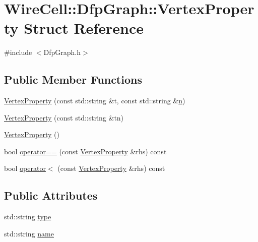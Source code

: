 \hypertarget{struct_wire_cell_1_1_dfp_graph_1_1_vertex_property}{}\section{Wire\+Cell\+:\+:Dfp\+Graph\+:\+:Vertex\+Property Struct Reference}
\label{struct_wire_cell_1_1_dfp_graph_1_1_vertex_property}


{\ttfamily \#include $<$Dfp\+Graph.\+h$>$}

\subsection*{Public Member Functions}
\begin{DoxyCompactItemize}
\item 
\hyperlink{struct_wire_cell_1_1_dfp_graph_1_1_vertex_property_afef179915e2a8a66724551085f56f5ac}{Vertex\+Property} (const std\+::string \&t, const std\+::string \&\hyperlink{format_8h_a9ab7e5832cef391eb8b1505a601fb215}{n})
\item 
\hyperlink{struct_wire_cell_1_1_dfp_graph_1_1_vertex_property_a5d8948abaad7fdf95ec657554fe7afdc}{Vertex\+Property} (const std\+::string \&tn)
\item 
\hyperlink{struct_wire_cell_1_1_dfp_graph_1_1_vertex_property_aebaece3fefd544d157a47677747ae10b}{Vertex\+Property} ()
\item 
bool \hyperlink{struct_wire_cell_1_1_dfp_graph_1_1_vertex_property_a21acb1b8b4e4c8444928de9b3c140289}{operator==} (const \hyperlink{struct_wire_cell_1_1_dfp_graph_1_1_vertex_property}{Vertex\+Property} \&rhs) const
\item 
bool \hyperlink{struct_wire_cell_1_1_dfp_graph_1_1_vertex_property_a6d23077e0e638d379389e69247624368}{operator$<$} (const \hyperlink{struct_wire_cell_1_1_dfp_graph_1_1_vertex_property}{Vertex\+Property} \&rhs) const
\end{DoxyCompactItemize}
\subsection*{Public Attributes}
\begin{DoxyCompactItemize}
\item 
std\+::string \hyperlink{struct_wire_cell_1_1_dfp_graph_1_1_vertex_property_a603229260abe259637bf0f4e82c6b4a0}{type}
\item 
std\+::string \hyperlink{struct_wire_cell_1_1_dfp_graph_1_1_vertex_property_a0c08a501c898e624ccc604b3601e2351}{name}
\end{DoxyCompactItemize}


